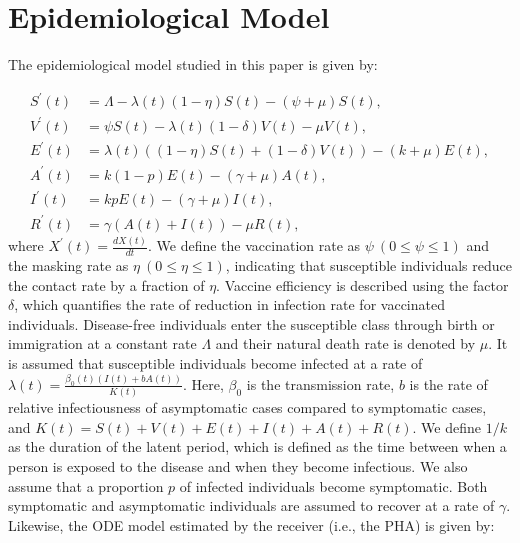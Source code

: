 \documentclass[sigconf,review]{acmart}
\begin{document}
\clearpage




\newpage
\appendix
\setcounter{table}{0}
\renewcommand{\thetable}{A\arabic{table}}

\setcounter{figure}{0}
\renewcommand{\thefigure}{A\arabic{figure}}

\section{Epidemiological Model}
\label{supp:epi_model}
The epidemiological model studied in this paper is given by:

\begin{align}
S^{\prime}(t) &= \Lambda - \lambda(t)(1-\eta)S(t) - (\psi + \mu)S(t), \nonumber \\
V^{\prime}(t) &= \psi S(t) - \lambda(t)(1-\delta)V(t) - \mu V(t), \nonumber \\
E^{\prime}(t) &= \lambda(t)\left((1-\eta)S(t) + (1-\delta)V(t)\right)- (k+\mu)E(t), \nonumber \\
A^{\prime}(t) &= k(1-p)E(t) - (\gamma+\mu)A(t), \nonumber \\
I^{\prime}(t) &= kpE(t) - (\gamma+\mu)I(t), \nonumber \\
R^{\prime}(t) &= \gamma (A(t) + I(t)) - \mu R(t), \label{eq_ODE}
\end{align}
where $X^{\prime}(t) = \frac{d X(t)}{d t}$. We define the vaccination rate as $\psi\ (0\leq \psi \leq 1)$ and the masking rate as $\eta\ (0\leq \eta \leq 1)$, indicating that susceptible individuals reduce the contact rate by a fraction of $\eta$. 
Vaccine efficiency is described using the factor $\delta$, which quantifies the rate of reduction in infection rate for vaccinated individuals. 
Disease-free individuals enter the susceptible class through birth or immigration at a constant rate $\Lambda$ and their natural death rate is denoted by $\mu$. It is assumed that susceptible individuals become infected at a rate of $\lambda(t) = \frac{\beta_0(t)(I(t)+bA(t))}{K(t)}$. Here, $\beta_0$ is the transmission rate, $b$ is the rate of relative infectiousness of asymptomatic cases compared to symptomatic cases, and $K(t) = S(t) + V(t) + E(t) + I(t) + A(t)+R(t)$. We define $1/k$ as the duration of the latent period, which is defined as the time between when a person is exposed to the disease and when they become infectious. We also assume that a proportion $p$ of infected individuals become symptomatic.  Both symptomatic and asymptomatic individuals are assumed to recover at a rate of $\gamma$. 
Likewise, the ODE model estimated by the receiver (i.e., the PHA) is given by:
\end{document}
